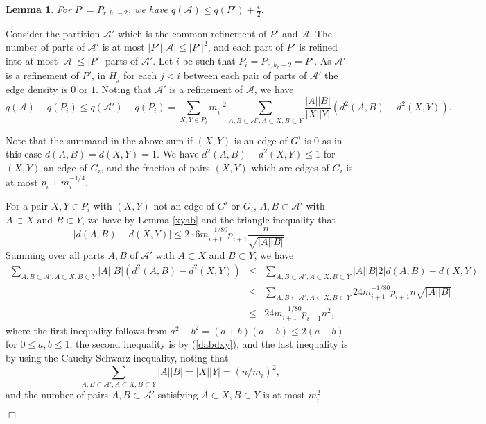 \documentclass[11pt]{article}
\newtheorem{lemma}{Lemma}[section]
\newenvironment{proof}
      {\medskip\noindent{\bf Proof:}\hspace{1mm}}
      {\hfill$\Box$\medskip}
\begin{document}
\begin{lemma}
For $P'=P_{r,h_r-2}$, we have $q(\mathcal{A}) \leq q(P')+\frac{\epsilon}{2}$.
\end{lemma}
\begin{proof}
Consider the partition $\mathcal{A}'$ which is the common refinement of $P'$
and $\mathcal{A}$. The number of parts of $\mathcal{A}'$ is at most
$|P'||\mathcal{A}| \leq |P'|^2$, and each part of $P'$ is refined into at most
$|\mathcal{A}| \leq |P'|$ parts of $\mathcal{A}'$. Let $i$ be such that $P_i=P_{r,h_r-2}=P'$.
As $\mathcal{A}'$ is a refinement of $P'$, in $H_j$ for each $j<i$ between each pair of parts of
$\mathcal{A}'$ the edge density is $0$ or $1$.
Noting that $\mathcal{A}'$ is a
refinement of $\mathcal{A}$, we have
\begin{equation}\label{qapi}q(\mathcal{A})-q(P_i)\leq q(\mathcal{A}')-q(P_i) =
\sum_{X,Y \in P_i} m_i^{-2}\sum_{A,B \subset \mathcal{A}', A \subset X, B
\subset Y} \frac{|A||B|}{|X||Y|}\left(d^2(A,B)-d^2(X,Y)\right).\end{equation}

Note that the summand in the above sum if $(X,Y)$ is an edge of $G^i$ is $0$ as
in this case  $d(A,B)=d(X,Y)=1$. We have $d^2(A,B)-d^2(X,Y) \leq 1$ for $(X,Y)$
an edge of $G_i$, and the fraction of pairs $(X,Y)$ which are edges of $G_i$ is
at most $p_i+m_i^{-1/4}$.

For a pair $X,Y \in P_i$ with $(X,Y)$ not an edge of $G^i$ or $G_i$, $A,B
\subset \mathcal{A}'$ with $A \subset X$ and $B \subset Y$, we have by Lemma
\ref{xyab} and the triangle inequality that
\begin{equation}\label{dabdxy}|d(A,B)-d(X,Y)| \leq 2 \cdot
6m_{i+1}^{-1/80}p_{i+1}\frac{n}{\sqrt{|A||B|}}.\end{equation}
Summing over all parts $A,B$ of $\mathcal{A}'$  with $A \subset X$ and $B
\subset Y$, we have
\begin{eqnarray*}\sum_{A,B \subset \mathcal{A}', A \subset X, B \subset Y}
|A||B|\left(d^2(A,B)-d^2(X,Y)\right) & \leq & \sum_{A,B \subset
\mathcal{A}', A \subset X, B \subset Y} |A||B|2\left|d(A,B)-d(X,Y)\right| \\ &
\leq & \sum_{A,B \subset \mathcal{A}', A \subset X, B \subset
Y}24m_{i+1}^{-1/80}p_{i+1}n\sqrt{|A||B|} \\ & \leq &
24m_{i+1}^{-1/80}p_{i+1}n^2,
\end{eqnarray*}
where the first inequality follows from $a^2-b^2=(a+b)(a-b) \leq 2(a-b)$ for $0
\leq a,b \leq 1$, the second inequality is by (\ref{dabdxy}), and the last
inequality is by using the Cauchy-Schwarz inequality, noting that $$\sum_{A,B
\subset \mathcal{A}', A \subset X, B \subset Y} |A||B|=|X||Y|=(n/m_i)^2,$$ and
the number of pairs $A, B \subset \mathcal{A}'$ satisfying  $A \subset X, B
\subset Y$ is at most $m_i^2$.


\end{proof}
\end{document}
